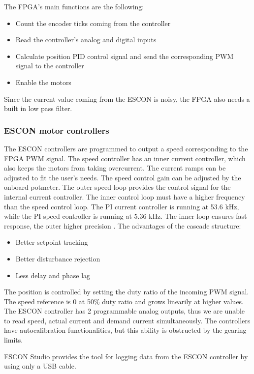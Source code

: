 The FPGA's main functions are the following:

\begin{itemize}	
	\setlength\itemsep{0em}
	\item Count the encoder ticks coming from the controller
	\item Read the controller's analog and digital inputs 
	\item Calculate position PID control signal and send the corresponding PWM signal to the controller
	\item Enable the motors
	
\end{itemize}

Since the current value coming from the ESCON is noisy, the FPGA also needs a built in low pass filter.

\subsubsection{ESCON motor controllers}
\label{escon_con}

The ESCON controllers are programmed to output a speed corresponding to the FPGA PWM signal. The speed controller has an inner current controller, which also keeps the motors from taking overcurrent. The current ramps can be adjusted to fit the user's needs. The speed control gain can be adjusted by the onboard potmeter. 
The outer speed loop provides the control signal for the internal current controller. The inner control loop must have a higher frequency than the speed control loop. The PI current controller is running at 53.6 kHz, while the PI speed controller is running at 5.36 kHz. The inner loop ensures fast response, the outer higher precision \cite{cascade_cont}. The advantages of the cascade structure:

\begin{itemize}
	\item Better setpoint tracking
	\item Better disturbance rejection
	\item Less delay and phase lag
\end{itemize}

The position is controlled by setting the duty ratio of the incoming PWM signal. The speed reference is 0 at 50\% duty ratio and grows linearily at higher values.
The ESCON controller has 2 programmable analog outputs, thus we are unable to read speed, actual current and demand current simultaneously.
The controllers have autocalibration functionalities, but this ability is obstructed by the gearing limits.

ESCON Studio provides the tool for logging data from the ESCON controller by using only a USB cable.